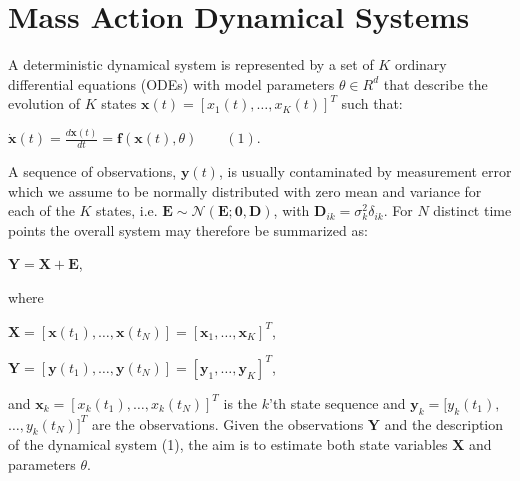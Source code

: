 \section{Mass Action Dynamical Systems}

\begin{par}
A deterministic dynamical system is represented by a set of $K$ ordinary differential equations (ODEs) with model parameters $\theta \in R^d$ that describe the evolution of $K$ states $\mathbf{x}(t) = [x_1(t),\ldots, x_K(t)]^T$ such that:
\end{par} \vspace{1em}
\begin{par}
$\dot{\mathbf{x}}(t) = \frac{d \mathbf{x}(t)}{d t} = \mathbf{f}(\mathbf{x}(t),\theta) \qquad (1)$.
\end{par} \vspace{1em}
\begin{par}
A sequence of observations, $\mathbf{y}(t)$, is usually contaminated by measurement error which we assume to be normally distributed with zero mean and variance for each of the $K$ states, i.e. $\mathbf{E}\sim \mathcal{N}(\mathbf{E};\mathbf{0},\mathbf{D})$, with $\mathbf{D}_{ik}=\sigma_k ^2 \delta_{ik}$. For $N$ distinct time points the overall system may therefore be summarized as:
\end{par} \vspace{1em}
\begin{par}
$\mathbf{Y} = \mathbf{X} + \mathbf{E}$,
\end{par} \vspace{1em}
\begin{par}
where
\end{par} \vspace{1em}
\begin{par}
$\mathbf{X} = [\mathbf{x}(t_1),\ldots,\mathbf{x}(t_N)] = [\mathbf{x}_1,\ldots,\mathbf{x}_K]^T$,
\end{par} \vspace{1em}
\begin{par}
$\mathbf{Y} = [\mathbf{y}(t_1),\ldots,\mathbf{y}(t_N)] = [\mathbf{y}_1,\ldots,\mathbf{y}_K]^T$,
\end{par} \vspace{1em}
\begin{par}
and $\mathbf{x}_k = [x_k(t_1),\ldots,x_k(t_N)]^T$ is the $k$'th state sequence and $\mathbf{y}_k = [y_k(t_1),$ $\ldots,y_k(t_N)]^T$ are the observations. Given the observations $\mathbf{Y}$ and the description of the dynamical system (1), the aim is to estimate both state variables $\mathbf{X}$ and parameters $\theta$.
\end{par} \vspace{1em}
